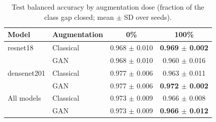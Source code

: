 \begin{table}[htbp]
\centering
\caption{Test balanced accuracy by augmentation dose (fraction of the class gap closed; mean $\pm$ SD over seeds).}
\label{tab:dose_balanced_accuracy}
\begin{tabular}{llcc}
\toprule
Model & Augmentation & 0\% & 100\% \\
\midrule
resnet18 & Classical & 0.968 $\pm$ 0.010 & \textbf{0.969 $\pm$ 0.002} \\
 & GAN & 0.968 $\pm$ 0.010 & 0.960 $\pm$ 0.016 \\
\addlinespace
densenet201 & Classical & 0.977 $\pm$ 0.006 & 0.963 $\pm$ 0.011 \\
 & GAN & 0.977 $\pm$ 0.006 & \textbf{0.972 $\pm$ 0.002} \\
\addlinespace
All models & Classical & 0.973 $\pm$ 0.009 & 0.966 $\pm$ 0.008 \\
 & GAN & 0.973 $\pm$ 0.009 & \textbf{0.966 $\pm$ 0.012} \\
\bottomrule
\end{tabular}
\end{table}